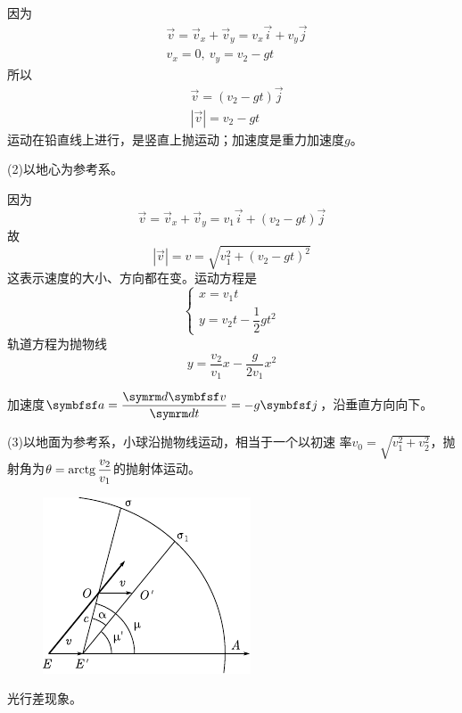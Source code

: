 因为\vspace{-1em}
\begin{align*}
    &\vec{v}=\vec{v}_x+\vec{v}_y=v_x\vec{i}+v_y\vec{j} \\
    &v_x=0,~ v_y=v_2-gt
\end{align*}
所以\vspace{-1em}
\begin{align*}
    &\vec{v}=\left(v_2-gt\right)\vec{j} \\
    &|\vec{v}|=v_2-gt
\end{align*}
运动在铅直线上进行，是竖直上抛运动；加速度是重力加速度$g$。

(2)以地心为参考系。

因为\vspace{-1em}
\begin{equation*}
    \vec{v}=\vec{v}_x+\vec{v}_y=v_1\vec{i}+\left(v_2-gt\right)\vec{j}
\end{equation*}
故\vspace{-1em}
\begin{equation*}
        |\vec{v}|=v=\sqrt{v_1^2+\left(v_2-gt\right)^2}
\end{equation*}
这表示速度的大小、方向都在变。运动方程是
\begin{equation*}
    \left\{\begin{array}{l}
        x=v_1t \\
        y=v_2t-\dfrac{1}{2}gt^2
    \end{array}\right.
\end{equation*}
轨道方程为抛物线
\begin{equation*}
    y=\frac{v_2}{v_1}x-\frac{g}{2v_1}x^2
\end{equation*}

\noindent 加速度$\vec{a}=\dfrac{\dif \vec{v}}{\dif t}=-g\vec{j}$，沿垂直方向向下。

(3)以地面为参考系，小球沿抛物线运动，相当于一个以初速
率$\displaystyle v_0=\sqrt{v_1^2+v_2^2}$，抛射角为$\theta=\operatorname{arctg}\dfrac{v_2}{v_1}$的抛射体运动。

\begin{figure}
    \vspace{1em}
    \centering
    \includegraphics{figure/fig02.09}
    \caption{}
    \label{fig:02.09}
\end{figure}
\example 光行差现象。


